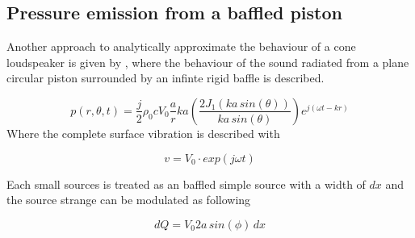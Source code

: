\subsection{Pressure emission from a baffled piston}
Another  approach to analytically approximate the behaviour of a cone loudspeaker is given by \citep[p. 179 ff.]{Kinsler2000}, where the behaviour of the sound radiated from a plane circular piston surrounded by an infinte rigid baffle is described.



\begin{equation}
p(r,\theta ,t)=\frac{j}{2} \rho_{0}c  V_{0}\frac{a}{r}ka \left ( \frac{2J_1(ka\, sin(\theta ))}{ka\, sin(\theta )} \right )e^{j(\omega t-kr)}
\end{equation}
Where the complete surface vibration is described with

\begin{equation}
v = V_{0} \cdot exp(j \omega t)
\end{equation}

\startexplain
\stopexplain
    
Each small sources is treated as an baffled simple source with a width of $dx$ and the source strange can be modulated as following      

\begin{equation}
dQ = V_{0} 2 a\, sin(\phi) \, dx
\end{equation}

